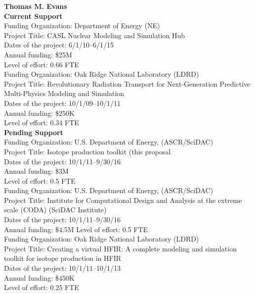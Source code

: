 \documentclass[11pt]{article}
\begin{document}

{\bf Thomas M. Evans}\\

{\bf Current Support}\\

Funding Organization: Department of Energy (NE)\\
Project Title: CASL Nuclear Modeling and Simulation Hub\\
Dates of the project: 6/1/10--6/1/15\\
Annual funding: \$25M\\
Level of effort: 0.66 FTE\\


Funding Organization: Oak Ridge National Laboratory (LDRD)\\
Project Title: Revolutionary Radiation Transport for Next-Generation
Predictive Multi-Physics Modeling and Simulation\\
Dates of the project:  10/1/09--10/1/11\\
Annual funding:  \$250K\\
Level of effort: 0.34 FTE\\

{\bf Pending Support}\\

Funding Organization:  U.S. Department of Energy, (ASCR/SciDAC)\\
Project Title: Isotope production toolkit (this proposal\\
Dates of the project: 10/1/11--9/30/16\\
Annual funding:  \$3M\\
Level of effort:  0.5 FTE\\

Funding Organization:  U.S. Department of Energy, (ASCR/SciDAC)\\
Project Title: Institute for Computational Design and Analysis at the extreme
scale (CODA) (SciDAC Institute)\\
Dates of the project: 10/1/11--9/30/16\\
Annual funding:  \$4.5M
Level of effort:  0.5 FTE\\

Funding Organization:  Oak Ridge National Laboratory (LDRD)\\
Project Title: Creating a virtual HFIR: A complete modeling and simulation
toolkit for isotope production in HFIR \\
Dates of the project: 10/1/11--10/1/13\\
Annual funding:  \$450K\\
Level of effort:  0.25 FTE\\
\end{document}
